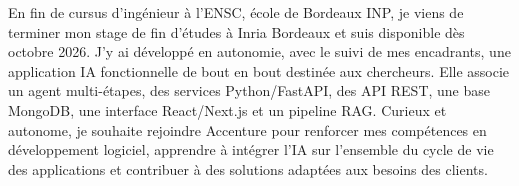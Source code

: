 
\begin{cvparagraph}
En fin de cursus d’ingénieur à l’ENSC, école de Bordeaux INP, je viens de terminer mon stage de fin d’études à Inria Bordeaux et suis disponible dès octobre 2026. J’y ai développé en autonomie, avec le suivi de mes encadrants, une application IA fonctionnelle de bout en bout destinée aux chercheurs. Elle associe un agent multi-étapes, des services Python/FastAPI, des API REST, une base MongoDB, une interface React/Next.js et un pipeline RAG. Curieux et autonome, je souhaite rejoindre Accenture pour renforcer mes compétences en développement logiciel, apprendre à intégrer l’IA sur l’ensemble du cycle de vie des applications et contribuer à des solutions adaptées aux besoins des clients.
\end{cvparagraph}
